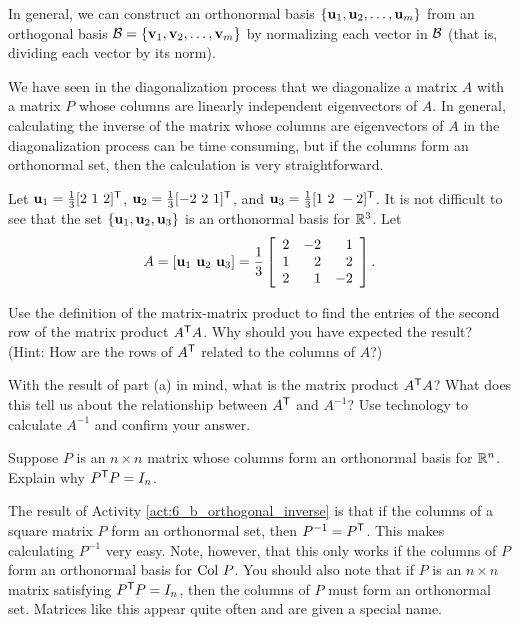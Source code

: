 In general, we can construct an orthonormal basis $\{\mathbf{u}_1, \mathbf{u}_2, \ldots, \mathbf{u}_m\}$ from an orthogonal basis $\mathcal{B} = \{\mathbf{v}_1, \mathbf{v}_2, \ldots, \mathbf{v}_m\}$ by normalizing each vector in $\mathcal{B}$ (that is, dividing each vector by its norm).



We have seen in the diagonalization process that we diagonalize a matrix $A$ with a matrix $P$ whose columns are linearly independent eigenvectors of $A$. In general, calculating the inverse of the matrix whose columns are eigenvectors of $A$ in the diagonalization process can be time consuming, but if the columns form an orthonormal set, then the calculation is very straightforward. 

\begin{activity} \label{act:6_b_orthogonal_inverse}  Let $\mathbf{u}_1 = \frac{1}{3}[2 \ 1 \ 2]^{\mathsf{T}}$, $\mathbf{u}_2 = \frac{1}{3}[-2 \ 2 \ 1]^{\mathsf{T}}$, and $\vu_3 = \frac{1}{3}[1 \ 2 \ -2]^{\tr}$. It is not difficult to see that the set $\{\mathbf{u}_1, \mathbf{u}_2, \mathbf{u}_3\}$ is an orthonormal basis for $\mathbb{R}^3$. Let 
\[A = [\mathbf{u}_1 \ \mathbf{u}_2 \ \mathbf{u}_3] = \frac{1}{3} \left[ \begin{array}{crr} 2&-2&1\\1&2&2\\2&1&-2 \end{array} \right].\] 
\ba
\item Use the definition of the matrix-matrix product to find the entries of the second row of the matrix product $A^{\mathsf{T}}A$. Why should you have expected the result? (Hint: How are the rows of $A^{\mathsf{T}}$ related to the columns of $A$?)

\item With the result of part (a) in mind, what is the matrix product $A^{\mathsf{T}}A$? What does this tell us about the relationship between $A^{\mathsf{T}}$ and $A^{-1}$? Use technology to calculate $A^{-1}$ and confirm your answer.

\item Suppose $P$ is an $n \times n$ matrix whose columns form an orthonormal basis for $\mathbb{R}^n$. Explain why $P^{\mathsf{T}}P = I_n$. 

\ea

\end{activity}

The result of Activity \ref{act:6_b_orthogonal_inverse} is that if the columns of a square matrix $P$ form an orthonormal set, then $P^{-1} = P^{\mathsf{T}}$. This makes calculating $P^{-1}$ very easy. Note, however,  that this only works if the columns of $P$ form an orthonormal basis for $\text{Col } P$. You should also note that if $P$ is an $n \times n$ matrix satisfying $P^{\mathsf{T}}P = I_n$, then the columns of $P$ must form an orthonormal set. Matrices like this appear quite often and are given a special name.


